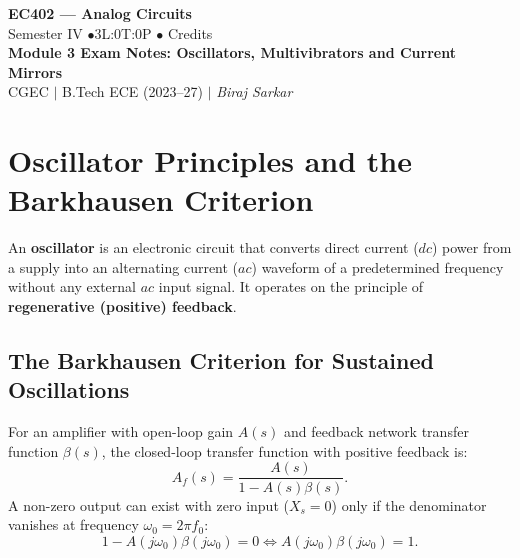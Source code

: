 \documentclass[12pt,a4paper]{article}
\begin{document}
\begin{center}
  {\LARGE\bfseries\color{myred} EC402 --- Analog Circuits}\\[5pt]
  {\normalsize\color{mydark} Semester IV \quad$\bullet$\quad 3L:0T:0P \quad$\bullet$ Credits}\\[3pt]
  {\normalsize\color{myteal}\textbf{Module 3 Exam Notes: Oscillators, Multivibrators and Current Mirrors}}\\[3pt]
  {\small\color{mydark} CGEC \;$|$\; B.Tech ECE (2023--27) \;$|$\; \textit{Biraj Sarkar}}
\end{center}
\vspace{2pt}
\noindent{\color{myred}\rule{\linewidth}{1.5pt}}
\vspace{2pt}

\hypersetup{linkcolor=mydark}
\tableofcontents
\hypersetup{linkcolor=myteal}
\newpage

\section{Oscillator Principles and the Barkhausen Criterion}

\begin{tcolorbox}[defbox, title={Oscillator Fundamentals}]
An \textbf{oscillator} is an electronic circuit that converts direct current ($dc$) power from a supply into an alternating current ($ac$) waveform of a predetermined frequency without any external $ac$ input signal. It operates on the principle of \textbf{regenerative (positive) feedback}.
\end{tcolorbox}

\subsection{The Barkhausen Criterion for Sustained Oscillations}
For an amplifier with open-loop gain $A(s)$ and feedback network transfer function $\beta(s)$, the closed-loop transfer function with positive feedback is:
\[
A_f(s) = \frac{A(s)}{1 - A(s)\beta(s)}.
\]
A non-zero output can exist with zero input ($X_s = 0$) only if the denominator vanishes at frequency $\omega_0 = 2\pi f_0$:
\[
1 - A(j\omega_0)\beta(j\omega_0) = 0 \iff A(j\omega_0)\beta(j\omega_0) = 1.
\]
\end{document}
